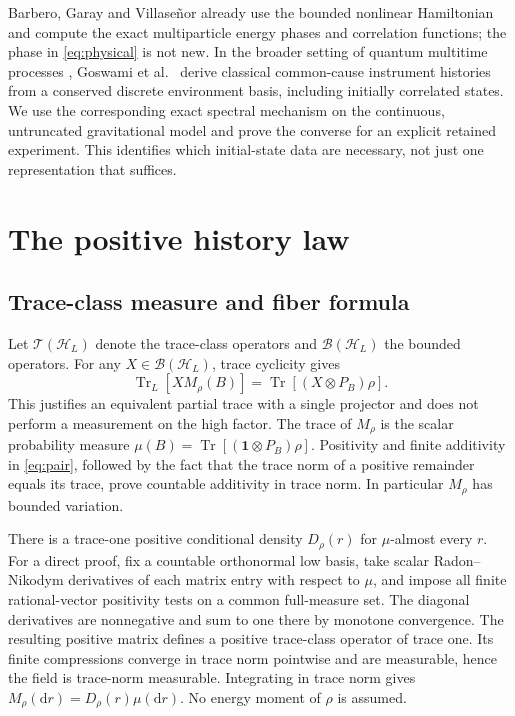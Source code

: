 \documentclass[11pt]{article}
\newcommand{\cH}{\mathcal H}
\newcommand{\cT}{\mathcal T}
\newcommand{\cB}{\mathcal B}
\newcommand{\tr}{\operatorname{Tr}}
\newcommand{\dd}{\mathrm d}
\newcommand{\one}{\mathbf 1}
\begin{document}
Barbero, Garay and Villase\~nor \cite[\S\S4--6]{BGV} already use the bounded nonlinear Hamiltonian and compute the exact multiparticle energy phases and correlation functions; the phase in \eqref{eq:physical} is not new. In the broader setting of quantum multitime processes \cite{PollockProcess,PollockMarkov}, Goswami et al.\ \cite[Thm.~1]{Goswami} derive classical common-cause instrument histories from a conserved discrete environment basis, including initially correlated states. We use the corresponding exact spectral mechanism on the continuous, untruncated gravitational model and prove the converse for an explicit retained experiment. This identifies which initial-state data are necessary, not just one representation that suffices.

\section{The positive history law}\label{sec:law}

\subsection{Trace-class measure and fiber formula}

Let \(\cT(\cH_L)\) denote the trace-class operators and \(\cB(\cH_L)\) the bounded operators. For any \(X\in\cB(\cH_L)\), trace cyclicity gives
\begin{equation}
 \tr_L[X M_\rho(B)]=\tr[(X\otimes P_B)\rho].
 \label{eq:pair}
\end{equation}
This justifies an equivalent partial trace with a single projector and does not perform a measurement on the high factor. The trace of \(M_\rho\) is the scalar probability measure \(\mu(B)=\tr[(\one\otimes P_B)\rho]\). Positivity and finite additivity in \eqref{eq:pair}, followed by the fact that the trace norm of a positive remainder equals its trace, prove countable additivity in trace norm. In particular \(M_\rho\) has bounded variation.

There is a trace-one positive conditional density \(D_\rho(r)\) for \(\mu\)-almost every \(r\). For a direct proof, fix a countable orthonormal low basis, take scalar Radon--Nikodym derivatives of each matrix entry with respect to \(\mu\), and impose all finite rational-vector positivity tests on a common full-measure set. The diagonal derivatives are nonnegative and sum to one there by monotone convergence. The resulting positive matrix defines a positive trace-class operator of trace one. Its finite compressions converge in trace norm pointwise and are measurable, hence the field is trace-norm measurable. Integrating in trace norm gives \(M_\rho(\dd r)=D_\rho(r)\mu(\dd r)\). No energy moment of \(\rho\) is assumed.
\end{document}
